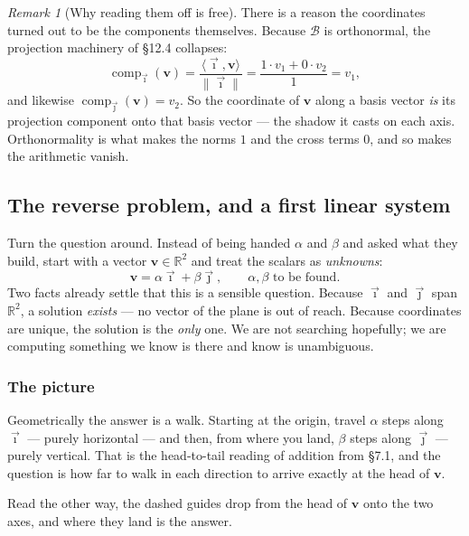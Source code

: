 \documentclass[11pt]{article}
\theoremstyle{definition}
\theoremstyle{remark}
\newtheorem*{rmk}{Remark}
\newcommand{\R}{\mathbb{R}}
\newcommand{\vc}[1]{\mathbf{#1}}
\newcommand{\norm}[1]{\lVert #1\rVert}
\newcommand{\comp}[2]{\operatorname{comp}_{#1}(#2)}
\newcommand{\ivec}{\vec{\imath}}
\newcommand{\jvec}{\vec{\jmath}}
\newcommand{\bas}{\mathcal{B}}
\begin{document}
\begin{rmk}[Why reading them off is free]
There is a reason the coordinates turned out to be the components themselves.
Because $\bas$ is orthonormal, the projection machinery of \S12.4 collapses:
\[
  \comp{\ivec}{\vc{v}}
  = \frac{\langle\ivec,\vc{v}\rangle}{\norm{\ivec}}
  = \frac{1\cdot v_1 + 0\cdot v_2}{1}
  = v_1 ,
\]
and likewise $\comp{\jvec}{\vc{v}}=v_2$. So the coordinate of $\vc{v}$ along a
basis vector \emph{is} its projection component onto that basis vector --- the
shadow it casts on each axis. Orthonormality is what makes the norms $1$ and the
cross terms $0$, and so makes the arithmetic vanish.
\end{rmk}

\subsection{The reverse problem, and a first linear system}
Turn the question around. Instead of being handed $\alpha$ and $\beta$ and
asked what they build, start with a vector $\vc{v}\in\R^{2}$ and treat the
scalars as \emph{unknowns}:
\[
  \vc{v} = \alpha\ivec + \beta\jvec ,
  \qquad \alpha,\beta \text{ to be found.}
\]
Two facts already settle that this is a sensible question. Because $\ivec$ and
$\jvec$ span $\R^{2}$, a solution \emph{exists} --- no vector of the plane is
out of reach. Because coordinates are unique, the solution is the \emph{only}
one. We are not searching hopefully; we are computing something we know is there
and know is unambiguous.

\subsubsection*{The picture}
Geometrically the answer is a walk. Starting at the origin, travel $\alpha$
steps along $\ivec$ --- purely horizontal --- and then, from where you land,
$\beta$ steps along $\jvec$ --- purely vertical. That is the head-to-tail
reading of addition from \S7.1, and the question is how far to walk in each
direction to arrive exactly at the head of $\vc{v}$.

Read the other way, the dashed guides drop from the head of $\vc{v}$ onto the
two axes, and where they land is the answer.
\end{document}
